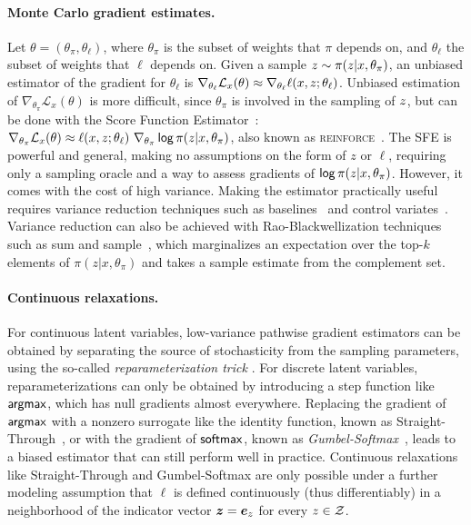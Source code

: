 \paragraph*{Monte Carlo gradient estimates.} Let $\theta=(\theta_\pi,
        \theta_\ell)$, where $\theta_\pi$ is the subset of weights that $\pi$
depends on, and $\theta_\ell$ the subset of weights that $\ell$
depends on. Given a sample $z \sim \pi(z| x,\theta_\pi)$, an
unbiased estimator of the gradient for  \wrt
$\theta_\ell$ is $\nabla_{\theta_\ell} \mathcal L_x(\theta) \approx
        \nabla_{\theta_\ell} \ell(x, z; \theta_\ell)$. Unbiased
estimation of $\nabla_{\theta_\pi} \mathcal L_x(\theta)$ is more
difficult, since $\theta_\pi$ is involved in the sampling of
$z$, but can be done with the Score Function
Estimator~\citep[SFE;][]{rubinstein1976monte,paisley2012variational}:
$\nabla_{\theta_\pi} \mathcal L_x(\theta) \approx \ell(x, z;
        \theta_\ell) ~ \nabla_{\theta_\pi} \operatorname*{\mathsf{log}} \pi(z | x, \theta_\pi)$,
also known as \textsc{reinforce}~\citep{Williams1992}. The SFE is
powerful and general, making no assumptions on the form of $z$ or
$\ell$, requiring only a sampling oracle and a way to assess
gradients of $\operatorname*{\mathsf{log}} \pi(z | x, \theta_\pi)$. However, it comes
with the cost of high variance. Making the estimator practically
useful requires variance reduction techniques such as
baselines~\citep{Williams1992,MuProp} and control
variates~\citep{CV2013,REBAR,RELAX}. Variance reduction can also be
achieved with Rao-Blackwellization techniques such as sum and
sample~\citep{casella1996rao,BBVI14,RB19}, which marginalizes an
expectation over the top-$k$ elements of $\pi(z| x,\theta_\pi)$ and
takes a sample estimate from the complement set.

\paragraph*{Continuous relaxations.} For continuous latent variables,
low-variance pathwise gradient estimators can be obtained by
separating the source of stochasticity from the sampling parameters,
using the so-called \emph{reparameterization trick}
\citep{Kingma+2014:VAE,RezendeEtAl14VAE}. For discrete latent
variables, reparameterizations can only be obtained by introducing a
step function like $\operatorname*{\mathsf{argmax}}$, which has null gradients almost everywhere.
Replacing the gradient of $\operatorname*{\mathsf{argmax}}$ with a nonzero surrogate like the identity
function, known as Straight-Through~\citep{STE}, or with the gradient of $\operatorname*{\mathsf{softmax}}$, known
as \emph{Gumbel-Softmax}~\citep{Concrete,GumbelSoftmax}, leads to a
biased estimator that can still perform well in practice. Continuous
relaxations like Straight-Through and Gumbel-Softmax are only
possible under a further modeling assumption that $\ell$ is defined
continuously (thus differentiably) in a neighborhood of the
indicator vector $\bm{z} = \bm{e}_{z}$ for every $z \in \mathcal{Z}$.

